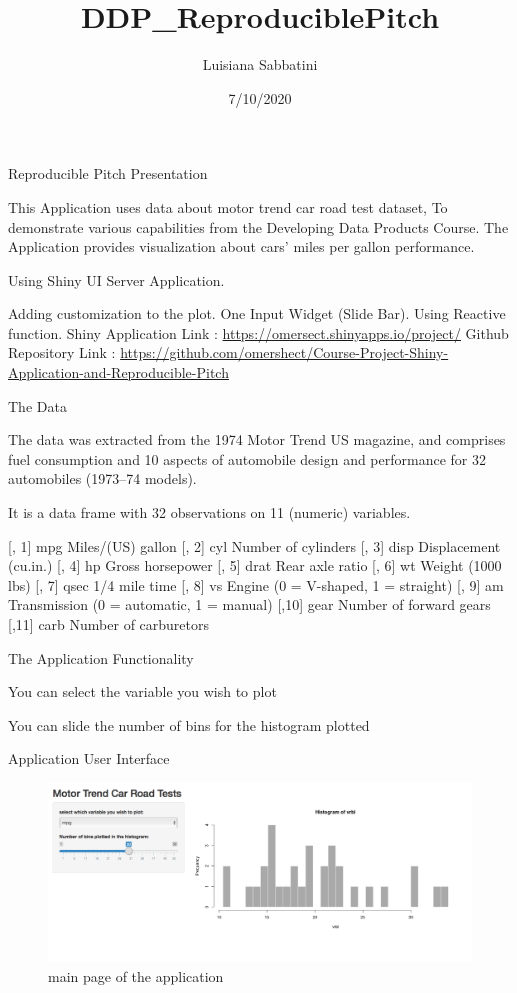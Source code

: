 \documentclass[ignorenonframetext,]{beamer}
\title{DDP\_ReproduciblePitch}
\author{Luisiana Sabbatini}
\date{7/10/2020}
\begin{document}
\frame{\titlepage}

\begin{frame}{Reproducible Pitch Presentation}
\protect\hypertarget{reproducible-pitch-presentation}{}

This Application uses data about motor trend car road test dataset, To
demonstrate various capabilities from the Developing Data Products
Course. The Application provides visualization about cars' miles per
gallon performance.

Using Shiny UI Server Application.

Adding customization to the plot. One Input Widget (Slide Bar). Using
Reactive function. Shiny Application Link :
\url{https://omersect.shinyapps.io/project/} Github Repository Link :
\url{https://github.com/omershect/Course-Project-Shiny-Application-and-Reproducible-Pitch}

\end{frame}

\begin{frame}{The Data}
\protect\hypertarget{the-data}{}

The data was extracted from the 1974 Motor Trend US magazine, and
comprises fuel consumption and 10 aspects of automobile design and
performance for 32 automobiles (1973--74 models).

It is a data frame with 32 observations on 11 (numeric) variables.

{[}, 1{]} mpg Miles/(US) gallon {[}, 2{]} cyl Number of cylinders {[},
3{]} disp Displacement (cu.in.) {[}, 4{]} hp Gross horsepower {[}, 5{]}
drat Rear axle ratio {[}, 6{]} wt Weight (1000 lbs) {[}, 7{]} qsec 1/4
mile time {[}, 8{]} vs Engine (0 = V-shaped, 1 = straight) {[}, 9{]} am
Transmission (0 = automatic, 1 = manual) {[},10{]} gear Number of
forward gears {[},11{]} carb Number of carburetors

\end{frame}

\begin{frame}{The Application Functionality}
\protect\hypertarget{the-application-functionality}{}

You can select the variable you wish to plot

You can slide the number of bins for the histogram plotted

\end{frame}

\begin{frame}{Application User Interface}
\protect\hypertarget{application-user-interface}{}

\begin{figure}
\centering
\includegraphics{AppUI.png}
\caption{main page of the application}
\end{figure}

\end{frame}
\end{document}
